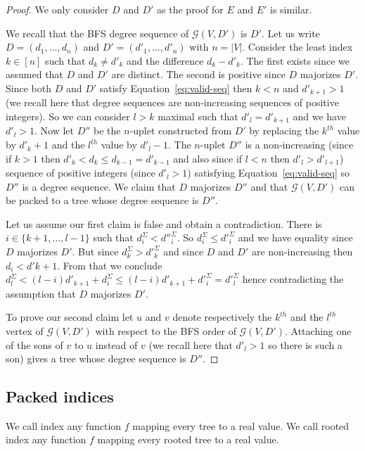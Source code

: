 \documentclass[11 pt]{modarticle}
\newcommand{\size}[1]{|#1|}
\newcommand{\greedy}[2]{\mathcal{G}(#1,#2)}
\begin{document}
\begin{proof}
We only consider $D$ and $D'$ as the proof for $E$ and $E'$ is similar.

We recall that the BFS degree sequence of $\greedy{V}{D'}$ is $D'$. Let us write $D = (d_1, \dots, d_n)$ and $D' = (d'_1, \dots, d'_n)$ with $n = \size{V}$. Consider the least index $k \in [n]$ such that $d_k \neq d'_k$ and the difference $d_k - d'_k$. The first exists since we assumed that $D$ and $D'$ are distinct. The second is positive since $D$ majorizes $D'$. Since both $D$ and $D'$ satisfy Equation~\eqref{eq:valid-seq} then $k < n$ and $d'_{k+1} > 1$ (we recall here that degree sequences are non-increasing sequences of positive integers). So we can consider $l > k$ maximal such that $d'_l = d'_{k+1}$ and we have $d'_l > 1$. Now let $D''$ be the $n$-uplet constructed from $D'$ by replacing the $k^{th}$ value by $d'_k+1$ and the $l^{th}$ value by $d'_l-1$. The $n$-uplet $D''$ is a non-increasing (since if $k > 1$ then $d'_k < d_k \leq d_{k-1} = d'_{k-1}$ and also since if $l < n$ then $d'_l > d'_{l+1}$) sequence of positive integers (since $d'_l > 1$) satisfying Equation~\eqref{eq:valid-seq} so $D''$ is a degree sequence. We claim that $D$ majorizes $D''$ and that $\greedy{V}{D'}$ can be packed to a tree whose degree sequence is $D''$.

Let us assume our first claim is false and obtain a contradiction. There is $i \in \{k+1, \dots, l-1\}$ such that $d^{\Sigma}_i < d''^{\Sigma}_i$. So $d^{\Sigma}_i \leq d'^{\Sigma}_i$ and we have equality since $D$ majorizes $D'$. But since $d^{\Sigma}_k > d'^{\Sigma}_k$ and since $D$ and $D'$ are non-increasing then $d_i < d'{k+1}$.  From that we conclude $d^{\Sigma}_l < (l-i) d'_{k+1} + d^{\Sigma}_i \leq (l-i) d'_{k+1} + d'^{\Sigma}_i = d'^{\Sigma}_l$ hence contradicting the assumption that $D$ majorizes $D'$. 

To prove our second claim let $u$ and $v$ denote respectively the $k^{th}$ and the $l^{th}$ vertex of $\greedy{V}{D'}$ with respect to the BFS order of $\greedy{V}{D'}$. Attaching one of the sons of $v$ to $u$ instead of $v$ (we recall here that $d'_l > 1$ so there is such a son) gives a tree whose degree sequence is $D''$.
\end{proof}

\subsection{Packed indices}

We call index any function $f$ mapping every tree to a real value. We call rooted index any function $f$ mapping every rooted tree to a real value.
\end{document}
